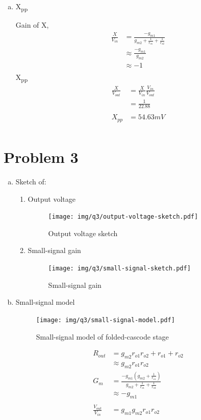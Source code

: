 \documentclass{article}
\begin{document}
\begin{enumerate}[(a)]
\item X\textsubscript{pp}

Gain of X,
\begin{equation*}
\begin{aligned}
\frac{X}{V_{in}} &= \frac{-g_{m1}}{g_{m2} + \frac{1}{r_{o1}} + \frac{1}{r_{o2}}} \\
&\approx \frac{-g_{m1}}{g_{m2}} \\
&\approx -1 \\
\end{aligned}
\end{equation*}
X\textsubscript{pp}
\begin{equation*}
\begin{aligned}
\frac{X}{V_{out}} &= \frac{X}{V_{in}}\frac{V_{in}}{V_{out}} \\
&= \frac{1}{22.88} \\
\\
X_{pp} &= 54.63 mV\\
\end{aligned}
\end{equation*}
\end{enumerate}
\section{Problem 3}
\label{sec:org0495006}
\begin{enumerate}[(a)]
\item Sketch of:
\begin{enumerate}[1.]
\item Output voltage
\begin{figure}[H]
\centering
\texttt{[image: img/q3/output-voltage-sketch.pdf]}
\caption{\label{fig:output-voltage-sketch-q3}Output voltage sketch}
\end{figure}
\item Small-signal gain
\begin{figure}[H]
\centering
\texttt{[image: img/q3/small-signal-sketch.pdf]}
\caption{\label{fig:small-signal-sketch-q3}Small-signal gain}
\end{figure}
\end{enumerate}
\item Small-signal model
\begin{figure}[H]
\centering
\texttt{[image: img/q3/small-signal-model.pdf]}
\caption{\label{fig:small-signal-model-q3}Small-signal model of folded-cascode stage}
\end{figure}

\begin{equation*}
\begin{aligned}
R_{out} &= g_{m2}r_{o1}r_{o2} + r_{o1} + r_{o2} \\
&\approx g_{m2}r_{o1}r_{o2}
\\
G_{m} &= \frac{-g_{m1}(g_{m2} + \frac{1}{r_{o1}})}{g_{m2} + \frac{1}{r_{o1}} + \frac{1}{r_{o2}}} \\
&\approx -g_{m1} \\
\\
\frac{V_{out}}{V_{in}} &= g_{m1}g_{m2}r_{o1}r_{o2} \\
\end{aligned}
\end{equation*}
\end{enumerate}
\end{document}
